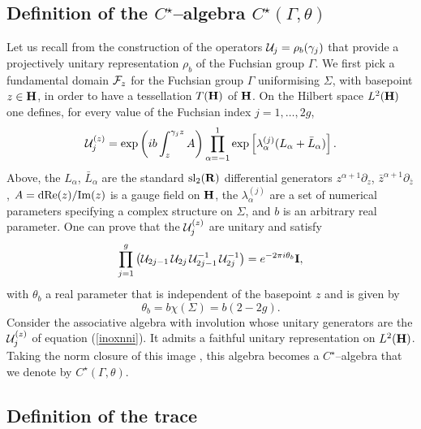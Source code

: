 \documentclass[a4paper,a4paper]{article}
\begin{document}
\subsection{Definition of the $C^\star$--algebra $C^{\star}(\Gamma, \theta)$}\label{defcstar} 

Let us recall from \cite{PROCEEDINGS} the construction of the operators 
${\cal U}_j=\rho_b(\gamma_j)$ that provide a projectively unitary 
representation $\rho_b$ of the Fuchsian group $\Gamma$.
We first pick a fundamental domain ${\cal F}_z$ for the 
Fuchsian group $\Gamma$ uniformising $\Sigma$, with basepoint  
$z\in{\bf H}$, in order to have a tessellation $T({\bf H})$ of ${\bf H}$.   
On the Hilbert space $L^2({\bf H})$ one defines,   
for every value of the Fuchsian index $j=1,\ldots, 2g$, 
\begin{equation}  
{\cal U}_j^{(z)}={\rm exp}\left(ib\int_z^{\gamma_j z} A\right)  
\prod_{\alpha=-1}^1{\rm  
exp}\left[\lambda_{\alpha}^{(j)}(L_{\alpha}+\bar L_{\alpha})\right].
\label{genu}
\end{equation}  
Above, the $L_{\alpha}$, $\bar L_{\alpha}$ are the standard 
${\rm sl}_2({\bf R})$ differential generators $z^{\alpha +1}\partial_z$, 
$\bar z^{\alpha +1}\partial_{\bar z}$, $A={\rm d}{\rm Re}(z)/{\rm Im} (z)$ 
is a gauge field on ${\bf H}$, 
the $\lambda_{\alpha}^{(j)}$ are a set of numerical parameters specifying  
a complex structure on $\Sigma$, and $b$ is an arbitrary real parameter.
One can prove that the ${\cal U}_j^{(z)}$ are unitary 
and satisfy 
\begin{equation}  
\prod_{j=1}^g\left({\cal U}_{2j-1}\,{\cal U}_{2j}\,{\cal U}_{2j-1}^{-1}\,  
{\cal U}_{2j}^{-1}\right)=e^{-2\pi i\theta_b}{{\bf  I}},  
\label{inoxnni}
\end{equation}  
with $\theta_b$ a real parameter that is independent of the basepoint $z$ 
and is given by 
\begin{equation}
\theta_b=b\chi(\Sigma)=b(2-2g).
\label{valueoftheta}
\end{equation}
Consider the associative algebra with involution whose unitary generators 
are the ${\cal U}_j^{(z)}$ of equation (\ref{inoxnni}). 
It admits a faithful unitary representation on $L^2({\bf H})$. 
Taking the norm closure of this image \cite{NCG}, this algebra becomes 
a $C^\star$--algebra that we denote by $C^{\star}(\Gamma, \theta)$. 

\subsection{Definition of the trace}\label{deftrace} 
 
\end{document}
